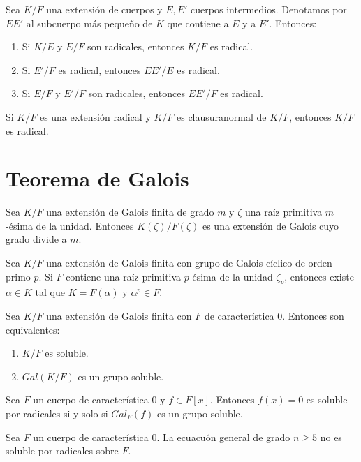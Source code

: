 \begin{proposition}
    Sea $K/F$ una extensión de cuerpos y $E, E'$ cuerpos intermedios. Denotamos por $EE'$ al subcuerpo más pequeño de $K$ que contiene a $E$ y a $E'$. Entonces:
    \begin{enumerate}
        \item Si $K/E$ y $E/F$ son radicales, entonces $K/F$ es radical.
        \item Si $E'/F$ es radical, entonces $EE'/E$ es radical.
        \item Si $E/F$ y $E'/F$ son radicales, entonces $EE'/F$ es radical.
    \end{enumerate}
\end{proposition}

\begin{proposition}
    Si $K/F$ es una extensión radical y $\bar{K}/F$ es clausuranormal de $K/F$, entonces $\bar{K}/F$ es radical.
\end{proposition}

\section{Teorema de Galois}

\begin{lemma}
    Sea $K/F$ una extensión de Galois finita de grado $m$ y $\zeta$ una raíz primitiva $m$-ésima de la unidad.
    Entonces $K(\zeta)/F(\zeta)$ es una extensión de Galois cuyo grado divide a $m$.
\end{lemma}

\begin{lemma}
    Sea $K/F$ una extensión de Galois finita con grupo de Galois cíclico de orden primo $p$.
    Si $F$ contiene una raíz primitiva $p$-ésima de la unidad $\zeta_p$, entonces existe $\alpha \in K$ tal que $K = F(\alpha)$ y $\alpha^p \in F$.
\end{lemma}

\begin{theorem}[Galois]
    Sea $K/F$ una extensión de Galois finita con $F$ de característica 0. Entonces son equivalentes:
    \begin{enumerate}
        \item $K/F$ es soluble.
        \item $Gal(K/F)$ es un grupo soluble.
    \end{enumerate}
\end{theorem}

\begin{corollary}[Galois]
    Sea $F$ un cuerpo de característica 0 y $f \in F[x]$.
    Entonces $f(x) = 0$ es soluble por radicales si y solo si $Gal_F(f)$ es un grupo soluble.
\end{corollary}

\begin{corollary}
    Sea $F$ un cuerpo de característica 0.
    La ecuacuón general de grado $n \geq 5$ no es soluble por radicales sobre $F$.
\end{corollary}